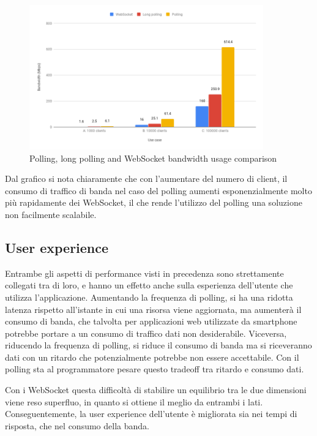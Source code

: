 \documentclass[12pt,a4paper,openright,twoside]{report}
\begin{document}
\begin{figure}[htbp]
\centering
\includegraphics[width=0.9\textwidth]{assets/bandwidth.png}
\caption{Polling, long polling and WebSocket bandwidth usage comparison}
\label{fig:bandwidth}
\end{figure}

Dal grafico si nota chiaramente che con l'aumentare del numero di client, il consumo di traffico di banda nel caso del polling aumenti esponenzialmente molto più rapidamente dei WebSocket, il che rende l'utilizzo del polling una soluzione non facilmente scalabile.

\subsection{User experience}
Entrambe gli aspetti di performance visti in precedenza sono strettamente collegati tra di loro, e hanno un effetto anche sulla esperienza dell'utente che utilizza l'applicazione. Aumentando la frequenza di polling, si ha una ridotta latenza rispetto all'istante in cui una risorsa viene aggiornata, ma aumenterà il consumo di banda, che talvolta per applicazioni web utilizzate da smartphone potrebbe portare a un consumo di traffico dati non desiderabile. Viceversa, riducendo la frequenza di polling, si riduce il consumo di banda ma si riceveranno dati con un ritardo che potenzialmente potrebbe non essere accettabile. Con il polling sta al programmatore pesare questo tradeoff tra ritardo e consumo dati.

Con i WebSocket questa difficoltà di stabilire un equilibrio tra le due dimensioni viene reso superfluo, in quanto si ottiene il meglio da entrambi i lati. Conseguentemente, la user experience dell'utente è migliorata sia nei tempi di risposta, che nel consumo della banda.

\end{document}
